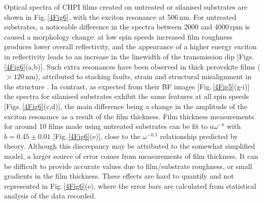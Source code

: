 Optical spectra of CHPI films created on untreated or silanised substrates are shown in Fig.\,\ref{4Fig6}, with the exciton resonance at 506\,nm. For untreated substrates, a noticeable difference in the spectra between 2000 and 4000\,rpm is caused a morphology change: at low spin speeds increased film roughness produces lower overall reflectivity, and the appearance of a higher energy exciton in reflectivity leads to an increase in the linewidth of the transmission dip [Figs.\,\ref{4Fig6}(a,b)]. Such extra resonances have been observed in thick perovskite films ($>120$\,nm), attributed to stacking faults, strain and structural misalignment in the structure \cite{VijayaPrakash2009}. In contrast, as expected from their BF images [Fig.\,\ref{4Fig5}(g-i)] the spectra for silanised substrates exhibit the same features at all spin speeds [Figs.\,\ref{4Fig6}(c,d)], the main difference being a change in the amplitude of the exciton resonance as a result of the film thickness. Film thickness measurements for around 10 films made using untreated substrates can be fit to $a\omega^{-b}$ with $b=0.45\pm0.01$ [Fig.\,\ref{4Fig6}(e)], close to the $\omega^{-0.5}$ relationship predicted by theory. Although this discrepancy may be attributed to the somewhat simplified model, a larger source of error comes from measurements of film thickness. It can be difficult to provide accurate values due to film/substrate roughness, or small gradients in the film thickness. These effects are hard to quantify and not represented in Fig.\,\ref{4Fig6}(e), where the error bars are calculated from statistical analysis of the data recorded.

